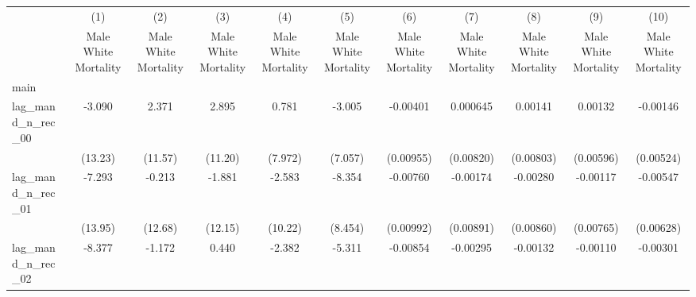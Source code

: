 {
\def\sym#1{\ifmmode^{#1}\else\(^{#1}\)\fi}
\begin{longtable}{l*{10}{c}}
\hline\hline\endfirsthead\hline\endhead\hline\endfoot\endlastfoot
                    &\multicolumn{1}{c}{(1)}&\multicolumn{1}{c}{(2)}&\multicolumn{1}{c}{(3)}&\multicolumn{1}{c}{(4)}&\multicolumn{1}{c}{(5)}&\multicolumn{1}{c}{(6)}&\multicolumn{1}{c}{(7)}&\multicolumn{1}{c}{(8)}&\multicolumn{1}{c}{(9)}&\multicolumn{1}{c}{(10)}\\
                    &\multicolumn{1}{c}{Male White Mortality}&\multicolumn{1}{c}{Male White Mortality}&\multicolumn{1}{c}{Male White Mortality}&\multicolumn{1}{c}{Male White Mortality}&\multicolumn{1}{c}{Male White Mortality}&\multicolumn{1}{c}{Male White Mortality}&\multicolumn{1}{c}{Male White Mortality}&\multicolumn{1}{c}{Male White Mortality}&\multicolumn{1}{c}{Male White Mortality}&\multicolumn{1}{c}{Male White Mortality}\\
\hline
main                &                     &                     &                     &                     &                     &                     &                     &                     &                     &                     \\
lag\_mand\_n\_rec\_00   &      -3.090         &       2.371         &       2.895         &       0.781         &      -3.005         &    -0.00401         &    0.000645         &     0.00141         &     0.00132         &    -0.00146         \\
                    &     (13.23)         &     (11.57)         &     (11.20)         &     (7.972)         &     (7.057)         &   (0.00955)         &   (0.00820)         &   (0.00803)         &   (0.00596)         &   (0.00524)         \\
[1em]
lag\_mand\_n\_rec\_01   &      -7.293         &      -0.213         &      -1.881         &      -2.583         &      -8.354         &    -0.00760         &    -0.00174         &    -0.00280         &    -0.00117         &    -0.00547         \\
                    &     (13.95)         &     (12.68)         &     (12.15)         &     (10.22)         &     (8.454)         &   (0.00992)         &   (0.00891)         &   (0.00860)         &   (0.00765)         &   (0.00628)         \\
[1em]
lag\_mand\_n\_rec\_02   &      -8.377         &      -1.172         &       0.440         &      -2.382         &      -5.311         &    -0.00854         &    -0.00295         &    -0.00132         &    -0.00110         &    -0.00301         \\

\end{longtable}}
